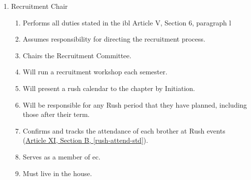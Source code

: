\begin{enumerate}
        	\item Recruitment Chair
			\begin{enumerate}
				\item Performs all duties stated in the \gls{ibl} Article V, Section 6, paragraph l
				\item Assumes responsibility for directing the recruitment process.
				\item Chairs the Recruitment Committee.
				\item Will run a recruitment workshop each semester.
				\item Will present a \gls{rush} calendar to the chapter by Initiation.
				\item Will be responsible for any Rush period that they have planned, including those after their term.
				\item Confirms and tracks the attendance of each brother at Rush events (\hyperref[rush-attend-std]{Article XI, Section B, \autoref*{rush-attend-std}}).
				\item Serves as a member of \gls{ec}. \label{recruit-chair-term}
                		\item Must live in the house.
			\end{enumerate}


\end{enumerate}
